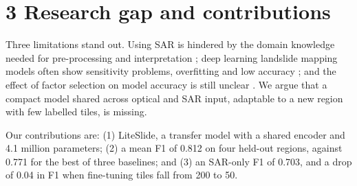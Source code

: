 \section{3 Research gap and contributions}

Three limitations stand out. Using SAR is hindered by the domain knowledge needed for pre-processing and interpretation \cite{boehm2022}; deep learning landslide mapping models often show sensitivity problems, overfitting and low accuracy \cite{ganerd2023}; and the effect of factor selection on model accuracy is still unclear \cite{chen2023}. We argue that a compact model shared across optical and SAR input, adaptable to a new region with few labelled tiles, is missing.

Our contributions are: (1) LiteSlide, a transfer model with a shared encoder and 4.1 million parameters; (2) a mean F1 of 0.812 on four held-out regions, against 0.771 for the best of three baselines; and (3) an SAR-only F1 of 0.703, and a drop of 0.04 in F1 when fine-tuning tiles fall from 200 to 50.
